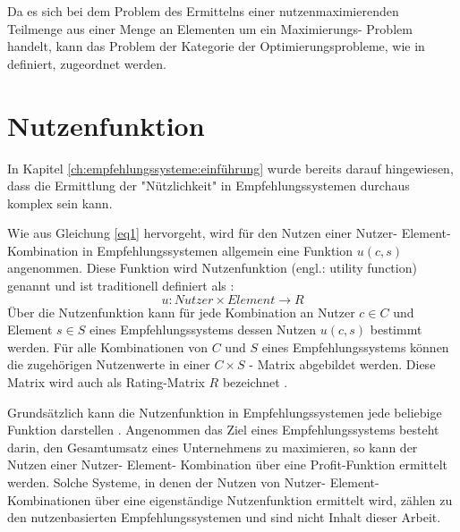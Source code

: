 Da es sich bei dem Problem des Ermittelns einer nutzenmaximierenden Teilmenge aus einer Menge an Elementen um ein Maximierungs- Problem handelt, kann das Problem der Kategorie der Optimierungsprobleme, wie in \textcite[S. 1]{book:kallrath} definiert, zugeordnet werden.

\section{Nutzenfunktion} %
\label{ch:empfehlungssysteme:nutzenfunktion}
In Kapitel \ref{ch:empfehlungssysteme:einführung} wurde bereits darauf hingewiesen, dass die Ermittlung der "Nützlichkeit" in Empfehlungssystemen durchaus komplex sein kann.

Wie aus Gleichung \ref{eq1} hervorgeht, wird für den Nutzen einer Nutzer- Element- Kombination in Empfehlungssystemen allgemein eine Funktion $u(c,s)$ angenommen.
Diese Funktion wird Nutzenfunktion (engl.: utility function) genannt und ist traditionell definiert als \cite[S. 195]{ricci:book}\cite[S. 3]{jawaheer:article}:
\begin{equation}\label{eq2}
    u: Nutzer \times Element \rightarrow R
\end{equation}
Über die Nutzenfunktion kann für jede Kombination an Nutzer $c \in C$ und Element $s \in S$ eines Empfehlungssystems dessen Nutzen $u(c,s)$ bestimmt werden.
Für alle Kombinationen von $C$ und $S$ eines Empfehlungssystems können die zugehörigen Nutzenwerte in einer $C \times S$ - Matrix abgebildet werden.
Diese Matrix wird auch als Rating-Matrix $R$ bezeichnet \cite[S. 11]{recommenderSystems:2016}\cite[S. 91]{ekstrand:article}.

Grundsätzlich kann die Nutzenfunktion in Empfehlungssystemen jede beliebige Funktion darstellen \cite[S. 735]{adomavicius:inproceedings}.
Angenommen das Ziel eines Empfehlungssystems besteht darin, den Gesamtumsatz eines Unternehmens zu maximieren, so kann der Nutzen einer Nutzer- Element- Kombination über eine Profit-Funktion ermittelt werden.
Solche Systeme, in denen der Nutzen von Nutzer- Element- Kombinationen über eine eigenständige Nutzenfunktion ermittelt wird, zählen zu den nutzenbasierten Empfehlungssystemen und sind nicht Inhalt dieser Arbeit.

